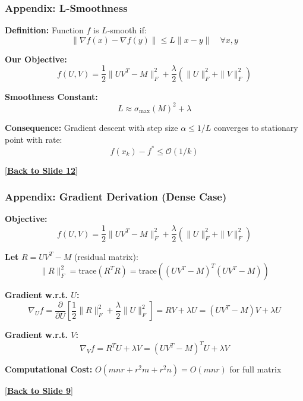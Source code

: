 \documentclass[aspectratio=169,usenames,dvipsnames]{beamer}
\begin{document}
\begin{frame}[label=app:smoothness]
\frametitle{Appendix: L-Smoothness}

\textbf{Definition:} Function $f$ is $L$-smooth if:
\[
\|\nabla f(x) - \nabla f(y)\| \leq L \|x - y\| \quad \forall x, y
\]

\vspace{0.3cm}

\textbf{Our Objective:}
\[
f(U, V) = \frac{1}{2}\|UV^T - M\|_F^2 + \frac{\lambda}{2}(\|U\|_F^2 + \|V\|_F^2)
\]

\vspace{0.3cm}

\textbf{Smoothness Constant:}
\[
L \approx \sigma_{\max}(M)^2 + \lambda
\]

\vspace{0.3cm}

\textbf{Consequence:} Gradient descent with step size $\alpha \leq 1/L$ converges to stationary point with rate:
\[
f(x_k) - f^* \leq \mathcal{O}(1/k)
\]

\hyperlink{12}{[\textbf{Back to Slide 12}]}

\end{frame}

\begin{frame}[label=app:grad_dense]
\frametitle{Appendix: Gradient Derivation (Dense Case)}

\textbf{Objective:}
\[
f(U, V) = \frac{1}{2}\|UV^T - M\|_F^2 + \frac{\lambda}{2}(\|U\|_F^2 + \|V\|_F^2)
\]

\vspace{0.3cm}

\textbf{Let} $R = UV^T - M$ (residual matrix):
\[
\|R\|_F^2 = \text{trace}(R^T R) = \text{trace}((UV^T - M)^T(UV^T - M))
\]

\vspace{0.3cm}

\textbf{Gradient w.r.t. $U$:}
\[
\nabla_U f = \frac{\partial}{\partial U}\left[\frac{1}{2}\|R\|_F^2 + \frac{\lambda}{2}\|U\|_F^2\right] = RV + \lambda U = (UV^T - M)V + \lambda U
\]

\vspace{0.3cm}

\textbf{Gradient w.r.t. $V$:}
\[
\nabla_V f = R^T U + \lambda V = (UV^T - M)^T U + \lambda V
\]

\vspace{0.3cm}

\textbf{Computational Cost:} $O(mnr + r^2 m + r^2 n) = O(mnr)$ for full matrix

\hyperlink{9}{[\textbf{Back to Slide 9}]}

\end{frame}
\end{document}
